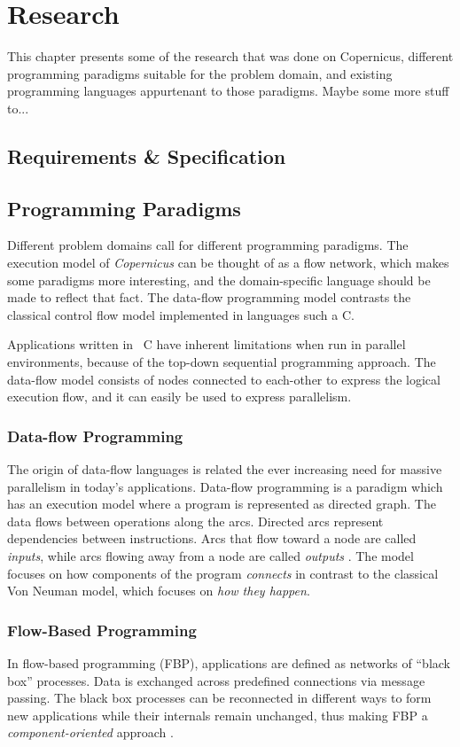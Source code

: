 \chapter{Research}\label{chap:research}
This chapter presents some of the research that was done on
Copernicus, different programming paradigms suitable for the problem
domain, and existing programming languages appurtenant to those
paradigms. Maybe some more stuff to...


\section{Requirements \& Specification}


\section{Programming Paradigms}
Different problem domains call for different programming
paradigms. The execution model of \emph{Copernicus} can be thought of
as a flow network, which makes some paradigms more interesting, and
the domain-specific language should be made to reflect that fact. The
data-flow programming model contrasts the classical control flow model
implemented in languages such a C.

Applications written in \eg~C have inherent limitations when run in
parallel environments, because of the top-down sequential programming
approach. The data-flow model consists of nodes connected to
each-other to express the logical execution flow, and it can easily be
used to express parallelism.


\subsection{Data-flow Programming}
The origin of data-flow languages is related the ever increasing need
for massive parallelism in today's applications. Data-flow programming
is a paradigm which has an execution model where a program is
represented as directed graph. The data flows between operations along
the arcs. Directed arcs represent dependencies between
instructions. Arcs that flow toward a node are called \emph{inputs},
while arcs flowing away from a node are called \emph{outputs}
\citep{johnston:2004}. The model focuses on how components of the
program \emph{connects} in contrast to the classical Von Neuman model,
which focuses on \emph{how they happen}.


\subsection{Flow-Based Programming}
In flow-based programming (FBP), applications are defined as networks
of ``black box'' processes. Data is exchanged across predefined
connections via message passing. The black box processes can be
reconnected in different ways to form new applications while their
internals remain unchanged, thus making FBP a
\emph{component-oriented} approach
\citep{morrison:2010,morrison:online}.


